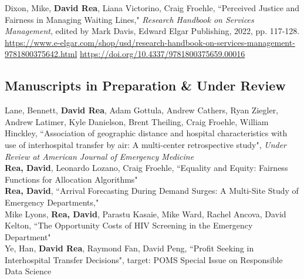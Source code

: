 \documentclass[12pt, letter]{moderncv}
\begin{document}
\medskip

Dixon, Mike, \textbf{David Rea}, Liana Victorino, Craig Froehle, ``Perceived Justice and Fairness in Managing Waiting Lines," \textit{Research Handbook on Services Management}, edited by Mark Davis, Edward Elgar Publishing, 2022, pp. 117-128.
\newline \url{https://www.e-elgar.com/shop/usd/research-handbook-on-services-management-9781800375642.html}
\newline \url{https://doi.org/10.4337/9781800375659.00016}

\newpage
\subsection{Manuscripts in Preparation \& Under Review}
\smallskip
Lane, Bennett, \textbf{David Rea}, Adam Gottula, Andrew Cathers, Ryan Ziegler,  Andrew Latimer,  Kyle Danielson, Brent Theiling, Craig Froehle, William Hinckley,  ``Association of geographic distance and hospital characteristics with use of interhospital transfer by air: A multi-center retrospective study", \textit{Under Review at American Journal of Emergency Medicine}
\medskip\\
\textbf{Rea, David}, Leonardo Lozano, Craig Froehle,  ``Equality and Equity: Fairness Functions for Allocation Algorithms" \textit{}
\medskip\\
\textbf{Rea, David}, ``Arrival Forecasting During Demand Surges: A Multi-Site Study of Emergency Departments," \textit{}
\medskip\\
 Mike Lyons, \textbf{Rea, David}, Parastu Kasaie, Mike Ward, Rachel Ancova, David Kelton, ``The Opportunity Costs of HIV Screening in the Emergency Department" 
\medskip \\
%
Ye, Han, \textbf{David Rea}, Raymond Fan, David Peng, ``Profit Seeking in Interhospital Transfer Decisions", target: POMS Special Issue on Responsible Data Science
\end{document}
